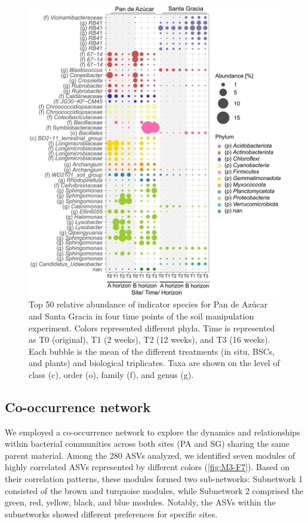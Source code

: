 \begin{figure}[H]
	\centering
	\includegraphics[width=1\textwidth]{img/M3-Figure_6.jpg}
	\caption{Top 50 relative abundance of indicator species for Pan de Azúcar and Santa Gracia in four time points of the soil manipulation experiment. Colors represented different phyla. Time is represented as T0 (original), T1 (2 weeks), T2 (12 weeks), and T3 (16 weeks). Each bubble is the mean of the different treatments (in situ, BSCs, and plants) and biological triplicates. Taxa are shown on the level of class (c), order (o), family (f), and genus (g).}
	\label{fig:M3-F6}
\end{figure}

\subsection{Co-occurrence network}

We employed a co-occurrence network to explore the dynamics and relationships within bacterial communities across both sites (PA and SG) sharing the same parent material. 
Among the \num{280} ASVs analyzed, we identified seven modules of highly correlated ASVs represented by different colors (\ref{fig:M3-F7}). 
Based on their correlation patterns, these modules formed two sub-networks: Subnetwork 1 consisted of the brown and turquoise modules, while Subnetwork 2 comprised the green, red, yellow, black, and blue modules. 
Notably, the ASVs within the subnetworks showed different preferences for specific sites. 

